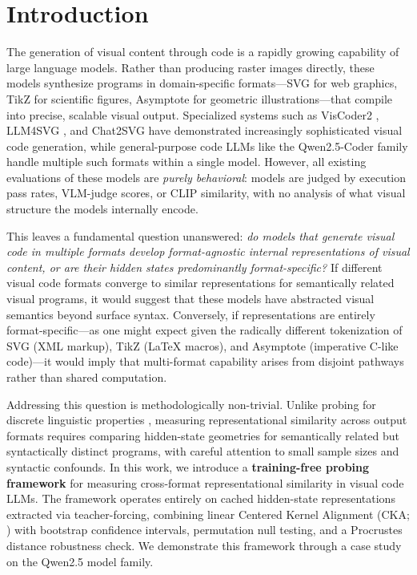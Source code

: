 
\section{Introduction}
\label{sec:intro}

The generation of visual content through code is a rapidly growing capability of large language models.
Rather than producing raster images directly, these models synthesize programs in domain-specific formats---SVG for web graphics, TikZ for scientific figures, Asymptote for geometric illustrations---that compile into precise, scalable visual output.
Specialized systems such as VisCoder2 \cite{viscoder2}, LLM4SVG \cite{llm4svg2025}, and Chat2SVG \cite{chat2svg2025} have demonstrated increasingly sophisticated visual code generation, while general-purpose code LLMs like the Qwen2.5-Coder family \cite{qwen25coder} handle multiple such formats within a single model.
However, all existing evaluations of these models are \emph{purely behavioral}: models are judged by execution pass rates, VLM-judge scores, or CLIP similarity, with no analysis of what visual structure the models internally encode.

This leaves a fundamental question unanswered: \emph{do models that generate visual code in multiple formats develop format-agnostic internal representations of visual content, or are their hidden states predominantly format-specific?}
If different visual code formats converge to similar representations for semantically related visual programs, it would suggest that these models have abstracted visual semantics beyond surface syntax.
Conversely, if representations are entirely format-specific---as one might expect given the radically different tokenization of SVG (XML markup), TikZ (\LaTeX{} macros), and Asymptote (imperative C-like code)---it would imply that multi-format capability arises from disjoint pathways rather than shared computation.

Addressing this question is methodologically non-trivial.
Unlike probing for discrete linguistic properties \cite{hewitt-manning-2019-structural, belinkov-2022-probing}, measuring representational similarity across output formats requires comparing hidden-state geometries for semantically related but syntactically distinct programs, with careful attention to small sample sizes and syntactic confounds.
In this work, we introduce a \textbf{training-free probing framework} for measuring cross-format representational similarity in visual code LLMs.
The framework operates entirely on cached hidden-state representations extracted via teacher-forcing, combining linear Centered Kernel Alignment (CKA; \citealt{kornblith2019similarity}) with bootstrap confidence intervals, permutation null testing, and a Procrustes distance robustness check.
We demonstrate this framework through a case study on the Qwen2.5 model family.

